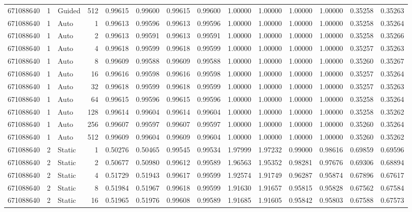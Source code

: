 \begin{tabular}{rrlrrrrrrrrrrr}
671088640 & 1 & Guided & 512 & 0.99615 & 0.99600 & 0.99615 & 0.99600 & 1.00000 & 1.00000 & 1.00000 & 1.00000 & 0.35258 & 0.35263 \\
671088640 & 1 & Auto & 1 & 0.99613 & 0.99596 & 0.99613 & 0.99596 & 1.00000 & 1.00000 & 1.00000 & 1.00000 & 0.35258 & 0.35264 \\
671088640 & 1 & Auto & 2 & 0.99613 & 0.99591 & 0.99613 & 0.99591 & 1.00000 & 1.00000 & 1.00000 & 1.00000 & 0.35258 & 0.35266 \\
671088640 & 1 & Auto & 4 & 0.99618 & 0.99599 & 0.99618 & 0.99599 & 1.00000 & 1.00000 & 1.00000 & 1.00000 & 0.35257 & 0.35263 \\
671088640 & 1 & Auto & 8 & 0.99609 & 0.99588 & 0.99609 & 0.99588 & 1.00000 & 1.00000 & 1.00000 & 1.00000 & 0.35260 & 0.35267 \\
671088640 & 1 & Auto & 16 & 0.99616 & 0.99598 & 0.99616 & 0.99598 & 1.00000 & 1.00000 & 1.00000 & 1.00000 & 0.35257 & 0.35264 \\
671088640 & 1 & Auto & 32 & 0.99618 & 0.99599 & 0.99618 & 0.99599 & 1.00000 & 1.00000 & 1.00000 & 1.00000 & 0.35257 & 0.35263 \\
671088640 & 1 & Auto & 64 & 0.99615 & 0.99596 & 0.99615 & 0.99596 & 1.00000 & 1.00000 & 1.00000 & 1.00000 & 0.35258 & 0.35264 \\
671088640 & 1 & Auto & 128 & 0.99614 & 0.99604 & 0.99614 & 0.99604 & 1.00000 & 1.00000 & 1.00000 & 1.00000 & 0.35258 & 0.35262 \\
671088640 & 1 & Auto & 256 & 0.99607 & 0.99597 & 0.99607 & 0.99597 & 1.00000 & 1.00000 & 1.00000 & 1.00000 & 0.35260 & 0.35264 \\
671088640 & 1 & Auto & 512 & 0.99609 & 0.99604 & 0.99609 & 0.99604 & 1.00000 & 1.00000 & 1.00000 & 1.00000 & 0.35260 & 0.35262 \\
671088640 & 2 & Static & 1 & 0.50276 & 0.50465 & 0.99545 & 0.99534 & 1.97999 & 1.97232 & 0.99000 & 0.98616 & 0.69859 & 0.69596 \\
671088640 & 2 & Static & 2 & 0.50677 & 0.50980 & 0.99612 & 0.99589 & 1.96563 & 1.95352 & 0.98281 & 0.97676 & 0.69306 & 0.68894 \\
671088640 & 2 & Static & 4 & 0.51729 & 0.51943 & 0.99617 & 0.99599 & 1.92574 & 1.91749 & 0.96287 & 0.95874 & 0.67896 & 0.67617 \\
671088640 & 2 & Static & 8 & 0.51984 & 0.51967 & 0.99618 & 0.99599 & 1.91630 & 1.91657 & 0.95815 & 0.95828 & 0.67562 & 0.67584 \\
671088640 & 2 & Static & 16 & 0.51965 & 0.51976 & 0.99608 & 0.99589 & 1.91685 & 1.91605 & 0.95842 & 0.95803 & 0.67588 & 0.67573 \\

\end{tabular}
